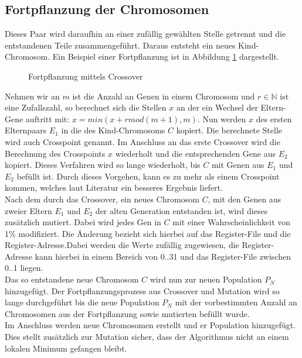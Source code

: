\subsection{Fortpflanzung der Chromosomen}
Dieses Paar wird daraufhin an einer zufällig gewählten Stelle getrennt und die entstandenen Teile zusammengeführt. Daraus entsteht ein neues Kind-Chromosom. Ein Beispiel einer Fortpflanzung ist in Abbildung \ref{fig:crossover} dargestellt.
\begin{figure}[htbp] 
	\centering
	
	\caption{Fortpflanzung mittels Crossover}
	\label{fig:crossover}
\end{figure}
Nehmen wir an $m$ ist die Anzahl an Genen in einem Chromosom und $r \in \mathbb{N}$ ist eine Zufallszahl, so berechnet sich die Stellen $x$ an der ein Wechsel der Eltern-Gene auftritt mit: $x= min(x+r mod(m+1),m)$. Nun werden $x$ des ersten Elternpaars $E_1$ in die des Kind-Chromosoms $C$ kopiert. Die berechnete Stelle wird auch Crosspoint genannt. Im Anschluss an das erste Crossover wird die Berechnung des Crosspoints $x$ wiederholt und die entsprechenden Gene aus $E_2$ kopiert. Dieses Verfahren wird so lange wiederholt, bis $C$ mit Genen aus $E_1$ und $E_2$ befüllt ist. Durch dieses Vorgehen, kann es zu mehr als einem Crosspoint kommen, welches laut Literatur ein besseres Ergebnis liefert.\cite{reeves2003genetic} \\
Nach dem durch das Crossover, ein neues Chromosom $C$, mit den Genen aus zweier Eltern $E_1$ und $E_2$ der alten Generation entstanden ist, wird dieses zusätzlich mutiert. Dabei wird jedes Gen in $C$ mit einer Wahrscheinlichkeit von 1\% modifiziert. Die Änderung bezieht sich hierbei auf das Register-File und die Register-Adresse.Dabei werden die Werte zufällig zugewiesen, die Register-Adresse kann hierbei in einem Bereich von 0..31 und das Register-File zwischen 0..1 liegen.\\
Das so entstandene neue Chromosom $C$ wird nun zur neuen Population $P_N$ hinzugefügt. Der Fortpflanzungsprozess aus Crossover und Mutation wird so lange durchgeführt bis die neue Population $P_N$ mit der vorbestimmten Anzahl an Chromosomen aus der Fortpflanzung sowie mutierten befüllt wurde.\\
Im Anschluss werden neue Chromosomen erstellt und er Population hinzugefügt. Dies stellt zusätzlich zur Mutation sicher, dass der Algorithmus nicht an einem lokalen Minimum gefangen bleibt. 

